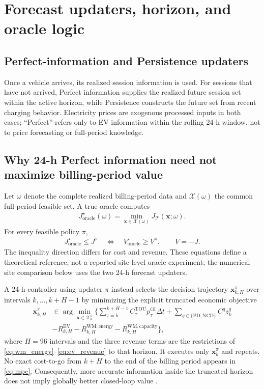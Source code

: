 \documentclass[final,5p,times]{elsarticle}
\newcommand{\dt}{\Delta t}
\newcommand{\EV}{\mathrm{EV}}
\newcommand{\GI}{\mathrm{GI}}
\newcommand{\TOU}{\mathrm{TOU}}
\newcommand{\PD}{\mathrm{PD}}
\newcommand{\NCD}{\mathrm{NCD}}
\newcommand{\WM}{\mathrm{WM}}
\newcommand{\calT}{\mathcal{T}}
\begin{document}
\section{Forecast updaters, horizon, and oracle logic}
\label{sec:oracle_logic}

\subsection{Perfect-information and Persistence updaters}
Once a vehicle arrives, its realized session information is used. For sessions
that have not arrived, Perfect information supplies the realized future session set within
the active horizon, while Persistence constructs the future set from recent
charging behavior. Electricity prices are exogenous processed inputs in both
cases; ``Perfect'' refers only to EV information within the rolling 24-h
window, not to price forecasting or full-period knowledge.

\subsection{Why 24-h Perfect information need not maximize billing-period value}
Let $\omega$ denote the complete realized billing-period data and
$\mathcal{X}(\omega)$ the common full-period feasible set. A true oracle computes
\begin{align}
J_{\mathrm{oracle}}^\star(\omega)
=\min_{\boldsymbol{x}\in\mathcal{X}(\omega)}
J_{\calT}(\boldsymbol{x};\omega). \label{eq:oracle}
\end{align}
For every feasible policy $\pi$,
\begin{align}
J_{\mathrm{oracle}}^\star\le J^\pi
\quad\Longleftrightarrow\quad
V_{\mathrm{oracle}}^\star\ge V^\pi,\qquad V=-J. \label{eq:oracle_dominance}
\end{align}
The inequality direction differs for cost and revenue. These equations define a theoretical reference, not a reported site-level oracle experiment; the numerical site comparison below uses the two 24-h forecast updaters.

A 24-h controller using updater $\pi$ instead selects the decision trajectory
$\boldsymbol{x}_{k,H}^{\pi}$ over intervals $k,\ldots,k+H-1$ by minimizing the
explicit truncated economic objective
\begin{align}
\boldsymbol{x}_{k,H}^{\pi}
&\in\arg\min_{\boldsymbol{x}\in\mathcal X_k^\pi}
\Bigg\{\sum_{\tau=k}^{k+H-1}C_\tau^{\TOU}p_\tau^{\GI}\dt
+\sum_{q\in\{\PD,\NCD\}}C^qz_k^q\nonumber\\
&-R_{k,H}^{\EV}-R_{k,H}^{\WM,\mathrm{energy}}
-R_{k,H}^{\WM,\mathrm{capacity}}\Bigg\}, \label{eq:mpc}
\end{align}
where $H=96$ intervals and the three revenue terms are the restrictions of
\eqref{eq:wm_energy}--\eqref{eq:ev_revenue} to that horizon. It executes only
$\boldsymbol{x}_k^\pi$ and repeats. No exact cost-to-go from $k+H$ to the end
of the billing period appears in \eqref{eq:mpc}. Consequently, more
accurate information inside the truncated horizon does not imply globally
better closed-loop value \cite{rawlings2017mpc}.
\end{document}
